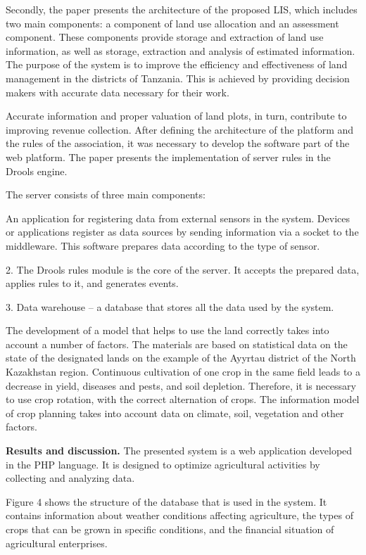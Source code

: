 Secondly, the paper presents the architecture of the proposed LIS, which
includes two main components: a component of land use allocation and an
assessment component. These components provide storage and extraction of
land use information, as well as storage, extraction and analysis of
estimated information. The purpose of the system is to improve the
efficiency and effectiveness of land management in the districts of
Tanzania. This is achieved by providing decision makers with accurate
data necessary for their work.

Accurate information and proper valuation of land plots, in turn,
contribute to improving revenue collection. After defining the
architecture of the platform and the rules of the association, it was
necessary to develop the software part of the web platform. The paper
presents the implementation of server rules in the Drools engine.

The server consists of three main components:

An application for registering data from external sensors in the system.
Devices or applications register as data sources by sending information
via a socket to the middleware. This software prepares data according to
the type of sensor.

2. The Drools rules module is the core of the server. It accepts the
prepared data, applies rules to it, and generates events.

3. Data warehouse -- a database that stores all the data used by the
system.

The development of a model that helps to use the land correctly takes
into account a number of factors. The materials are based on statistical
data on the state of the designated lands on the example of the Ayyrtau
district of the North Kazakhstan region. Continuous cultivation of one
crop in the same field leads to a decrease in yield, diseases and pests,
and soil depletion. Therefore, it is necessary to use crop rotation,
with the correct alternation of crops. The information model of crop
planning takes into account data on climate, soil, vegetation and other
factors.

{\bfseries Results and discussion.} The presented system is a web
application developed in the PHP language. It is designed to optimize
agricultural activities by collecting and analyzing data.

Figure 4 shows the structure of the database that is used in the system.
It contains information about weather conditions affecting agriculture,
the types of crops that can be grown in specific conditions, and the
financial situation of agricultural enterprises.

